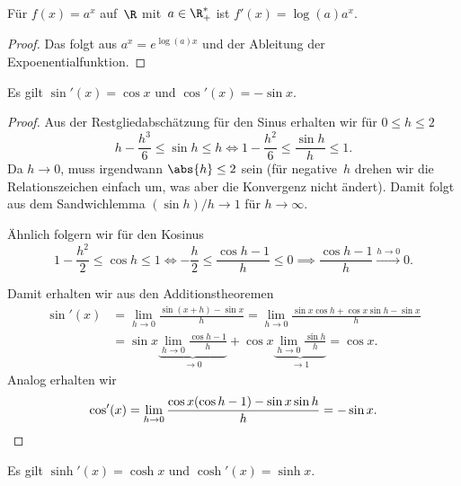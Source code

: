 \documentclass[a4paper]{article}
\begin{document}
\begin{proposition}
    Für $f(x) = a^x$ auf~$\R$ mit~$a \in \R_+^*$ ist $f'(x) = \log(a)a^x$.
\end{proposition}

\begin{proof}
    Das folgt aus $a^x = e^{\log(a)x}$ und der Ableitung der Expoenentialfunktion.
\end{proof}

\begin{proposition}
    Es gilt $\sin'(x) = \cos x$ und $\cos'(x) = -\sin x$.
\end{proposition}

\begin{proof}
    Aus der Restgliedabschätzung für den Sinus erhalten wir für $0 \leq h \leq 2$
    \begin{equation*}
        h-\frac{h^3}{6} \leq \sin h \leq h \iff 1-\frac{h^2}{6} \leq \frac{\sin h}{h} \leq 1.
    \end{equation*}
    Da $h \to 0$, muss irgendwann $\abs{h} \leq 2$ sein (für negative~$h$ drehen wir die Relationszeichen einfach um, was aber die Konvergenz nicht ändert). Damit folgt aus dem Sandwichlemma $(\sin h)/h \to 1$ für $h \to \infty$.

    Ähnlich folgern wir für den Kosinus
    \begin{equation*}
        1 - \frac{h^2}{2} \leq \cos h \leq 1 \iff -\frac{h}{2} \leq \frac{\cos h-1}{h} \leq 0 \implies \frac{\cos h-1}{h} \xrightarrow{h\to0} 0.
    \end{equation*}

    Damit erhalten wir aus den Additionstheoremen
    \begin{align*}
        \sin'(x) & = \lim_{h\to0} \frac{\sin(x+h)-\sin x}{h} = \lim_{h\to0} \frac{\sin x\cos h + \cos x\sin h - \sin x}{h}                             \\
                 & = \sin x \underbrace{\lim_{h\to0} \frac{\cos h-1}{h}}_{\to 0} + \cos x \underbrace{\lim_{h\to0} \frac{\sin h}{h}}_{\to 1} = \cos x.
    \end{align*}
    Analog erhalten wir
    \begin{equation*}
        \cos'(x) = \lim_{h\to0} \frac{\cos x(\cos h-1) - \sin x\sin h}{h} = -\sin x. \qedhere
    \end{equation*}
\end{proof}

\begin{proposition}
    Es gilt $\sinh'(x) = \cosh x$ und $\cosh'(x) = \sinh x$.
\end{proposition}
\end{document}
